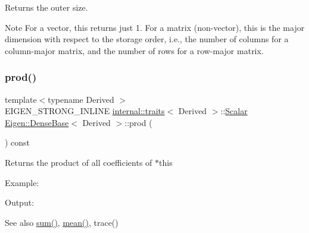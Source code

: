 \begin{DoxyReturn}{Returns}
the outer size.
\end{DoxyReturn}
\begin{DoxyNote}{Note}
For a vector, this returns just 1. For a matrix (non-\/vector), this is the major dimension with respect to the storage order, i.\+e., the number of columns for a column-\/major matrix, and the number of rows for a row-\/major matrix. 
\end{DoxyNote}
\mbox{\label{class_eigen_1_1_dense_base_a175ceb201923b4c6767770559e47e40e}} 
\subsubsection{\texorpdfstring{prod()}{prod()}}
{\footnotesize\ttfamily template$<$typename Derived $>$ \\
E\+I\+G\+E\+N\+\_\+\+S\+T\+R\+O\+N\+G\+\_\+\+I\+N\+L\+I\+NE \mbox{\hyperlink{struct_eigen_1_1internal_1_1traits}{internal\+::traits}}$<$ Derived $>$\+::\mbox{\hyperlink{class_eigen_1_1_dense_base_a5feed465b3a8e60c47e73ecce83e39a2}{Scalar}} \mbox{\hyperlink{class_eigen_1_1_dense_base}{Eigen\+::\+Dense\+Base}}$<$ Derived $>$\+::prod (\begin{DoxyParamCaption}{ }\end{DoxyParamCaption}) const}

\begin{DoxyReturn}{Returns}
the product of all coefficients of $\ast$this
\end{DoxyReturn}
Example\+: 
\begin{DoxyCodeInclude}{0}
\end{DoxyCodeInclude}
 Output\+: 
\begin{DoxyVerbInclude}
\end{DoxyVerbInclude}


\begin{DoxySeeAlso}{See also}
\mbox{\hyperlink{class_eigen_1_1_dense_base_a4dee689c76ff86da9d8e49950604597b}{sum()}}, \mbox{\hyperlink{class_eigen_1_1_dense_base_a89d85ac0cf349eb53481c148033459d7}{mean()}}, trace() 
\end{DoxySeeAlso}
\mbox{\label{class_eigen_1_1_dense_base_ae97f8d9d08f969c733c8144be6225756}} 
